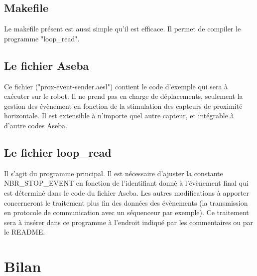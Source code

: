 \documentclass[a4paper, 12pt]{report}
\begin{document}
\section{Makefile}
Le makefile présent est aussi simple qu'il est efficace. Il permet de compiler le programme "loop\_read".

\section{Le fichier Aseba}
Ce fichier ("prox-event-sender.aesl") contient le code d'exemple qui sera à exécuter sur le robot. Il ne prend pas en charge de déplacements, seulement la gestion des évènement en fonction de la stimulation des capteurs de proximité horizontale. Il est extensible à n'importe quel autre capteur, et intégrable à d'autre codes Aseba.

\section{Le fichier loop\_read}
Il s'agit du programme principal. Il est nécessaire d'ajuster la constante \\NBR\_STOP\_EVENT en fonction de l'identifiant donné à l'évènement final qui est déterminé dans le code du fichier Aseba. Les autres modifications à apporter concerneront le traitement plus fin des données des évènements (la transmission en protocole de communication avec un séquenceur par exemple). Ce traitement sera à insérer dans ce programme à l'endroit indiqué par les commentaires ou par le README.

\chapter{Bilan}
\end{document}
